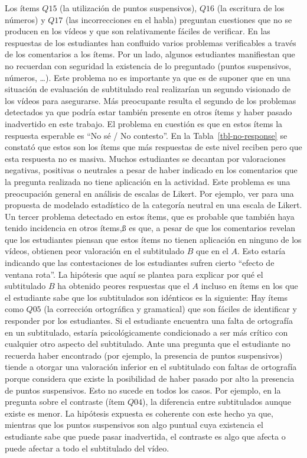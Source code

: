 \documentclass[
  12pt,
  a4paper,
  extrafontsizes,
  onecolumn,
  openright,
  table]{memoir}
\begin{document}
Los ítems \(Q15\) (la utilización de puntos suspensivos), \(Q16\) (la
escritura de los números) y \(Q17\) (las incorrecciones en el habla)
preguntan cuestiones que no se producen en los vídeos y que son
relativamente fáciles de verificar. En las respuestas de los estudiantes
han confluido varios problemas verificables a través de los comentarios
a los ítems. Por un lado, algunos estudiantes manifiestan que no
recuerdan con seguridad la existencia de lo preguntado (puntos
suspensivos, números, \ldots). Este problema no es importante ya que es
de suponer que en una situación de evaluación de subtitulado real
realizarían un segundo visionado de los vídeos para asegurarse. Más
preocupante resulta el segundo de los problemas detectados ya que podría
estar también presente en otros ítems y haber pasado inadvertido en este
trabajo. El problema en cuestión es que en estos ítems la respuesta
esperable es \enquote{No sé / No contesto}. En la
Tabla~\ref{tbl-no-response} se constató que estos son los ítems que más
respuestas de este nivel reciben pero que esta respuesta no es masiva.
Muchos estudiantes se decantan por valoraciones negativas, positivas o
neutrales a pesar de haber indicado en los comentarios que la pregunta
realizada no tiene aplicación en la actividad. Este problema es una
preocupación general en análisis de escalas de Likert. Por ejemplo, ver
\textcite{tutz2020} para una propuesta de modelado estadístico de la
categoría neutral en una escala de Likert. Un tercer problema detectado
en estos ítems, que es probable que también haya tenido incidencia en
otros ítems,ß es que, a pesar de que los comentarios revelan que los
estudiantes piensan que estos ítems no tienen aplicación en ninguno de
los vídeos, obtienen peor valoración en el subtitulado \(B\) que en el
\(A\). Esto estaría indicando que las contestaciones de los estudiantes
sufren cierto \enquote{efecto de ventana rota}. La hipótesis que aquí se
plantea para explicar por qué el subtitulado \(B\) ha obtenido peores
respuestas que el \(A\) incluso en ítems en los que el estudiante sabe
que los subtitulados son idénticos es la siguiente: Hay ítems como
\(Q05\) (la corrección ortográfica y gramatical) que son fáciles de
identificar y responder por los estudiantes. Si el estudiante encuentra
una falta de ortografía en un subtitulado, estaría psicológicamente
condicionado a ser más crítico con cualquier otro aspecto del
subtitulado. Ante una pregunta que el estudiante no recuerda haber
encontrado (por ejemplo, la presencia de puntos suspensivos) tiende a
otorgar una valoración inferior en el subtitulado con faltas de
ortografía porque considera que existe la posibilidad de haber pasado
por alto la presencia de puntos suspensivos. Esto no sucede en todos los
casos. Por ejemplo, en la pregunta sobre el contraste (ítem \(Q04\)), la
diferencia entre subtitulados aunque existe es menor. La hipótesis
expuesta es coherente con este hecho ya que, mientras que los puntos
suspensivos son algo puntual cuya existencia el estudiante sabe que
puede pasar inadvertida, el contraste es algo que afecta o puede afectar
a todo el subtitulado del vídeo.
\end{document}
